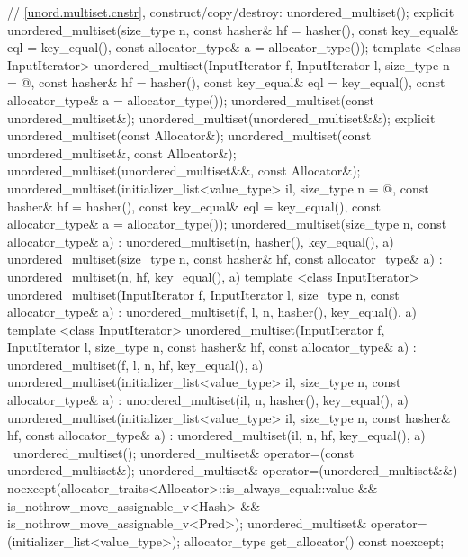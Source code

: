 \begin{codeblock}
{{    // \ref{unord.multiset.cnstr}, construct/copy/destroy:
    unordered_multiset();
    explicit unordered_multiset(size_type n,
                                const hasher& hf = hasher(),
                                const key_equal& eql = key_equal(),
                                const allocator_type& a = allocator_type());
    template <class InputIterator>
      unordered_multiset(InputIterator f, InputIterator l,
                         size_type n = @\seebelow@,
                         const hasher& hf = hasher(),
                         const key_equal& eql = key_equal(),
                         const allocator_type& a = allocator_type());
    unordered_multiset(const unordered_multiset&);
    unordered_multiset(unordered_multiset&&);
    explicit unordered_multiset(const Allocator&);
    unordered_multiset(const unordered_multiset&, const Allocator&);
    unordered_multiset(unordered_multiset&&, const Allocator&);
    unordered_multiset(initializer_list<value_type> il,
                       size_type n = @\seebelow@,
                       const hasher& hf = hasher(),
                       const key_equal& eql = key_equal(),
                       const allocator_type& a = allocator_type());
    unordered_multiset(size_type n, const allocator_type& a)
      : unordered_multiset(n, hasher(), key_equal(), a) { }
    unordered_multiset(size_type n, const hasher& hf, const allocator_type& a)
      : unordered_multiset(n, hf, key_equal(), a) { }
    template <class InputIterator>
      unordered_multiset(InputIterator f, InputIterator l, size_type n, const allocator_type& a)
        : unordered_multiset(f, l, n, hasher(), key_equal(), a) { }
    template <class InputIterator>
      unordered_multiset(InputIterator f, InputIterator l, size_type n, const hasher& hf, 
                         const allocator_type& a)
      : unordered_multiset(f, l, n, hf, key_equal(), a) { }
    unordered_multiset(initializer_list<value_type> il, size_type n, const allocator_type& a)
      : unordered_multiset(il, n, hasher(), key_equal(), a) { }
    unordered_multiset(initializer_list<value_type> il, size_type n, const hasher& hf, 
                       const allocator_type& a)
      : unordered_multiset(il, n, hf, key_equal(), a) { }
    ~unordered_multiset();
    unordered_multiset& operator=(const unordered_multiset&);
    unordered_multiset& operator=(unordered_multiset&&)
      noexcept(allocator_traits<Allocator>::is_always_equal::value &&
               is_nothrow_move_assignable_v<Hash> &&
               is_nothrow_move_assignable_v<Pred>);
    unordered_multiset& operator=(initializer_list<value_type>);
    allocator_type get_allocator() const noexcept;

}}
\end{codeblock}
